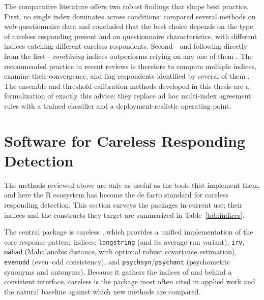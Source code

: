The comparative literature offers two robust findings that shape best practice.
First, no single index dominates across conditions:
\textcite{niessen2016detecting} compared several methods on web-questionnaire
data and concluded that the best choice depends on the type of careless
responding present and on questionnaire characteristics, with different indices
catching different careless respondents. Second---and following directly from
the first---\emph{combining} indices outperforms relying on any one of them
\parencite{curran2016methods, schroeders2022detecting}. The recommended
practice in recent reviews is therefore to compute multiple indices, examine
their convergence, and flag respondents identified by several of them
\parencite{ward2023dealing, desimone2015best}. The ensemble and threshold-calibration
methods developed in this thesis are a formalization of exactly this advice: they
replace ad hoc multi-index agreement rules with a trained classifier and a
deployment-realistic operating point.

\section{Software for Careless Responding Detection}

The methods reviewed above are only as useful as the tools that implement them,
and here the \textsf{R} ecosystem has become the de facto standard for careless
responding detection. This section surveys the packages in current use; their
indices and the constructs they target are summarized in
Table~\ref{tab:indices}.

The central package is \textsf{careless} \parencite{yentes2023careless}, which
provides a unified implementation of the core response-pattern indices:
\texttt{longstring} (and its average-run variant), \texttt{irv}, \texttt{mahad}
(Mahalanobis distance, with optional robust covariance estimation),
\texttt{evenodd} (even--odd consistency), and \texttt{psychsyn}/\texttt{psychant}
(psychometric synonyms and antonyms). Because it gathers the indices of
\textcite{meade2012identifying} and \textcite{curran2016methods} behind a
consistent interface, \textsf{careless} is the package most often cited in
applied work and the natural baseline against which new methods are compared.

